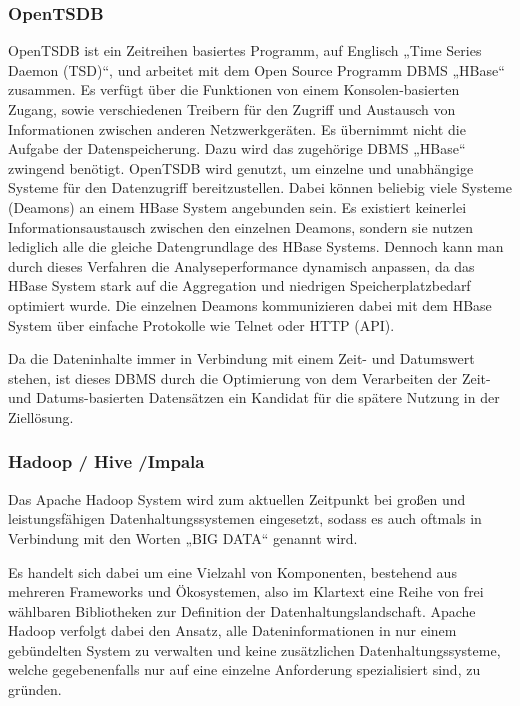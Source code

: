 \subsubsection{OpenTSDB}
\label{subsubsec:opentsdb}
OpenTSDB ist ein Zeitreihen basiertes Programm, auf Englisch „Time Series
Daemon (TSD)“, und arbeitet mit dem Open Source Programm \gls{DBMS} „HBase“
zusammen.  Es verfügt über die Funktionen von einem Konsolen-basierten Zugang,
sowie verschiedenen Treibern für den Zugriff und Austausch von Informationen
zwischen anderen Netzwerkgeräten. Es übernimmt nicht die Aufgabe der
Datenspeicherung. Dazu wird das zugehörige \gls{DBMS} „HBase“ zwingend
benötigt. OpenTSDB wird genutzt, um einzelne und unabhängige Systeme für den
Datenzugriff bereitzustellen. Dabei können beliebig viele Systeme (Deamons) an
einem HBase System angebunden sein. Es existiert keinerlei
Informationsaustausch zwischen den einzelnen Deamons, sondern sie nutzen
lediglich alle die gleiche Datengrundlage des HBase Systems. Dennoch kann man
durch dieses Verfahren die Analyseperformance dynamisch anpassen, da das HBase
System stark auf die Aggregation und niedrigen Speicherplatzbedarf optimiert
wurde. Die einzelnen Deamons kommunizieren dabei mit dem HBase System über
einfache Protokolle wie Telnet oder HTTP (API).

Da die Dateninhalte immer in Verbindung mit einem Zeit- und Datumswert stehen,
ist dieses \gls{DBMS} durch die Optimierung von dem Verarbeiten der Zeit- und
Datums-basierten Datensätzen ein Kandidat für die spätere Nutzung in der
Ziellösung.
\nl%

\subsubsection{Hadoop / Hive /Impala}
\label{subsubsec:hadoop_hive_impala}
Das Apache Hadoop System wird zum aktuellen Zeitpunkt bei
großen und leistungsfähigen Datenhaltungssystemen eingesetzt, sodass es
auch oftmals in Verbindung mit den Worten „BIG DATA“ genannt wird.

Es handelt sich dabei um eine Vielzahl von Komponenten, bestehend aus mehreren
Frameworks und Ökosystemen, also im Klartext eine Reihe von frei wählbaren
Bibliotheken zur Definition der Datenhaltungslandschaft. Apache Hadoop verfolgt
dabei den Ansatz, alle Dateninformationen in nur einem gebündelten System zu
verwalten und keine zusätzlichen Datenhaltungssysteme, welche gegebenenfalls
nur auf eine einzelne Anforderung spezialisiert sind, zu gründen.

